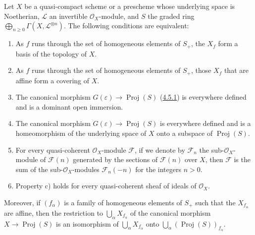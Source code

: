 \begin{theorem}[4.5.2]
\label{II.4.5.2}
Let $X$ be a quasi-compact scheme or a prescheme whose underlying space
is Noetherian, $\mathcal{L}$ an invertible $\mathcal{O}_X$-module, and $S$
the graded ring
$\bigoplus_{n\geq0}\Gamma(X,\mathcal{L}^{\otimes n})$. The following
conditions are equivalent:
\begin{enumerate}
  \item[\rm{a)}] As $f$ runs through the set of homogeneous elements of
  $S_+$, the $X_f$ form a basis of the topology of $X$.
  \item[\rm{a')}] As $f$ runs through the set of homogeneous elements of
  $S_+$, those $X_f$ that are affine form a covering of $X$.
  \item[\rm{b)}] The canonical morphism
  $G(\varepsilon)\to\operatorname{Proj}(S)$
  \textup{(\hyperref[II.4.5.1]{4.5.1})} is everywhere defined and is a dominant
  open immersion.


  \item[\rm{b')}] The canonical morphism
  $G(\varepsilon)\to\operatorname{Proj}(S)$ is everywhere defined and is a
  homeomorphism of the underlying space of $X$ onto a subspace of
  $\operatorname{Proj}(S)$.
  \item[\rm{c)}] For every quasi-coherent $\mathcal{O}_X$-module
  $\mathcal{F}$, if we denote by $\mathcal{F}_n$ the
  sub-$\mathcal{O}_X$-module of $\mathcal{F}(n)$ generated by the sections of
  $\mathcal{F}(n)$ over $X$, then $\mathcal{F}$ is the sum of the
  sub-$\mathcal{O}_X$-modules $\mathcal{F}_n(-n)$ for the integers $n>0$.
  \item[\rm{c')}] Property \textup{c)} holds for every quasi-coherent sheaf
  of ideals of $\mathcal{O}_X$.
\end{enumerate}
Moreover, if $(f_\alpha)$ is a family of homogeneous elements of $S_+$
such that the $X_{f_\alpha}$ are affine, then the restriction to
$\bigcup_\alpha X_{f_\alpha}$ of the canonical morphism
$X\to\operatorname{Proj}(S)$ is an isomorphism of
$\bigcup_\alpha X_{f_\alpha}$ onto
$\bigcup_\alpha(\operatorname{Proj}(S))_{f_\alpha}$.
\end{theorem}

